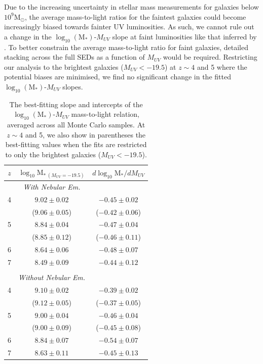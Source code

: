 Due to the increasing uncertainty in stellar mass measurements for galaxies below $10^{9} \text{M}_{\odot}$, the average mass-to-light ratios for the faintest galaxies could become increasingly biased towards fainter UV luminosities. As such, we cannot rule out a change in the $\log_{10} (\text{M}_{*})$-$M_{UV}$ slope at faint luminosities like that inferred by \citet{2012ApJ...752...66L}. To better constrain the average mass-to-light ratio for faint galaxies, detailed stacking across the full SEDs as a function of $M_{UV}$ would be required. Restricting our analysis to the brightest galaxies ($M_{UV} < -19.5$) at $z\sim4$ and 5 where the potential biases are minimised, we find no significant change in the fitted $\log_{10} (\text{M}_{*})$-$M_{UV}$ slopes.

\begin{table}
\caption[Short caption]{The best-fitting slope and intercepts of the $\log_{10} (\text{M}_{*})$-$M_{UV}$ mass-to-light relation, averaged across all Monte Carlo samples. At $z\sim 4$ and 5, we also show in parentheses the best-fitting values when the fits are restricted to only the brightest galaxies ($M_{UV} < -19.5$).}
\centering
\begin{tabular}{c c c}
\hline
$z$ & $\log_{10}\text{M}_{*~(M_{UV}=-19.5)}$ & $d\log_{10}\text{M}_{*}/dM_{UV}$ \\ 
\hline
 & \emph{With Nebular Em.} & \\
4 & $9.02 \pm 0.02$ & $-0.45\pm 0.02$ \\
  & ($9.06 \pm 0.05$) &  ($-0.42 \pm 0.06$) \\
5 & $8.84 \pm 0.04$ & $-0.47\pm 0.04$ \\
  & ($8.85 \pm 0.12$) &  ($-0.46 \pm 0.11$) \\
6 & $8.64 \pm 0.06$ & $-0.48\pm 0.07$ \\
7 & $8.49 \pm 0.09$ & $-0.44\pm 0.12$ \\
 & & \\
 & \emph{Without Nebular Em.} & \\
4 & $9.10 \pm 0.02$ & $-0.39\pm 0.02$ \\
  & ($9.12 \pm 0.05$) &  ($-0.37 \pm 0.05$) \\
5 & $9.00 \pm 0.04$ & $-0.46\pm 0.04$ \\
  & ($9.00 \pm 0.09$) &  ($-0.45 \pm 0.08$) \\
6 & $8.84 \pm 0.07$ & $-0.54\pm 0.07$ \\
7 & $8.63 \pm 0.11$ & $-0.45\pm 0.13$ \\ 

\hline
\end{tabular}
\label{tab:ML}
\end{table}

